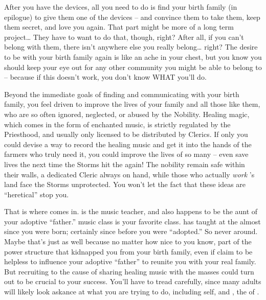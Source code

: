 \documentclass[char]{GL2020}
\begin{document}
After you have the devices, all you need to do is find your birth family (in epilogue) to give them one of the devices -- and convince them to take them, keep them secret, and love you again. That part might be more of a long term project\ldots{} They have to want to do that, though, right? After all, if you can't belong with them, there isn't anywhere else you really belong\ldots{} right? The desire to be with your birth family again is like an ache in your chest, but you know you should keep your eye out for any other community you might be able to belong to -- because if this doesn't work, you don't know WHAT you'll do.

Beyond the immediate goals of finding and communicating with your birth family, you feel driven to improve the lives of your family and all those like them, who are so often ignored, neglected, or abused by the Nobility. Healing magic, which comes in the form of enchanted music, is strictly regulated by the Priesthood, and usually only licensed to be distributed by Clerics. If only you could devise a way to record the healing music and get it into the hands of the farmers who truly need it, you could improve the lives of so many -- even save lives the next time the Storms hit the \pFarm{} again!  The nobility remain safe within their walls, a dedicated Cleric always on hand, while those who actually \emph{work} \cFarmGod{}'s land face the Storms unprotected. You won't let the fact that these ideas are ``heretical''  stop you.

That is where \cMusic{\full} comes in. \cMusic{} is the music teacher, and also happens to be the aunt of your adoptive ``father.'' \cMusic{\Their} music class is your favorite class. \cMusic{} has taught at the \pSchool{} almost since you were born; certainly since before you were ``adopted.'' So \cMusic{\they} \cMusic{\were} never around. Maybe that's just as well because no matter how nice \cMusic{\theyare} to you know, \cMusic{\theyare} part of the power structure that kidnapped you from your birth family, even if \cMusic{\they}claim\cMusic{\plural} to be helpless to influence your adoptive ``father'' to reunite you with your real family. But recruiting \cMusic{} to the cause of sharing healing music with the masses could turn out to be crucial to your success. You'll have to tread carefully, since many adults will likely look askance at what you are trying to do, including \cMusic{} \cMusic{\them}self, and \cHedonist{}, the \cHedonist{\cleric} of \cFarmGod{}. 
\end{document}
